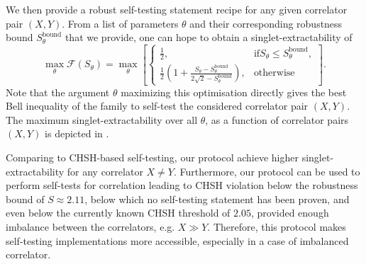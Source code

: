 We then provide a robust self-testing statement recipe for any given correlator pair $(X,Y)$.
From a list of parameters $\theta$ and their corresponding robustness bound $S_\theta^\text{bound}$ that we provide, one can hope to obtain a singlet-extractability of 
\begin{equation}
	\max_\theta \mathcal{F}(S_\theta) = \max_\theta \left[ \begin{cases}
			\frac{1}{2},& \text{if} S_\theta \leq S_\theta^\text{bound}, \\
			\frac{1}{2}\left(1+\frac{S_\theta - S_\theta^\text{bound}}{2\sqrt{2}-S_\theta^\text{bound}}\right), & \text{otherwise}
	\end{cases} \right].
	\label{eq:singlet-extractability-theta}
\end{equation}
Note that the argument $\theta$ maximizing this optimisation directly gives the best Bell inequality of the family  to self-test the considered correlator pair $(X,Y)$.
The maximum singlet-extractability over all $\theta$, as a function of correlator pairs $(X,Y)$ is depicted in .

Comparing to CHSH-based self-testing, our protocol achieve higher singlet-extractability for any correlator $X\neq Y$.
Furthermore, our protocol can be used to perform self-tests for correlation leading to CHSH violation below the robustness bound of $S\approx 2.11$, below which no self-testing statement has been proven, and even below the currently known CHSH threshold of $2.05$, provided enough imbalance between the correlators, e.g. $X \gg Y$.
Therefore, this protocol makes self-testing implementations more accessible, especially in a case of imbalanced correlator.

